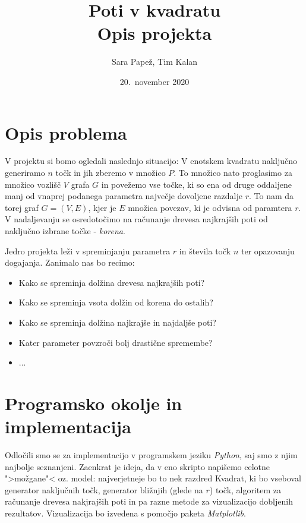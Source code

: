 \documentclass[12pt,a4paper]{article}
\title{Poti v kvadratu \\
       \large Opis projekta}
\author{Sara Papež, Tim Kalan}
\date{20.~november 2020}
\begin{document}
\begin{titlepage}
 \maketitle

\end{titlepage}

\section{Opis problema}
V projektu si bomo ogledali naslednjo situacijo: V enotskem kvadratu naključno 
generiramo $n$ točk in jih zberemo v množico $P$. To množico nato proglasimo 
za množico vozlišč $V$ grafa $G$ in povežemo vse točke, ki so ena od druge oddaljene 
manj od vnaprej podanega parametra največje dovoljene razdalje $r$. To nam da torej 
graf $G = (V, E)$, kjer je $E$ množica povezav, ki je odvisna od paramtera $r$. V 
nadaljevanju se osredotočimo na računanje drevesa najkrajših poti od naključno 
izbrane točke - \textit{korena}.

Jedro projekta leži v spreminjanju parametra $r$ in števila točk $n$ ter opazovanju 
dogajanja. Zanimalo nas bo recimo:

\begin{itemize}
       \item Kako se spreminja dolžina drevesa najkrajših poti?
       \item Kako se spreminja vsota dolžin od korena do ostalih?
       \item Kako se spreminja dolžina najkrajše in najdaljše poti?
       \item Kater parameter povzroči bolj drastične spremembe?
       \item ...
\end{itemize}


\section{Programsko okolje in implementacija}
Odločili smo se za implementacijo v programskem jeziku \emph{Python}, saj smo z njim
najbolje seznanjeni. Zaenkrat je ideja, da v eno skripto napišemo celotne ">možgane"<
oz. model: najverjetneje bo to nek razdred Kvadrat, ki bo vseboval generator naključnih 
točk, generator bližnjih (glede na $r$) točk, algoritem za računanje drevesa nakjrajših 
poti in pa razne metode za vizualizacijo dobljenih rezultatov. Vizualizacija bo izvedena 
s pomočjo paketa \emph{Matplotlib}.
\end{document}

